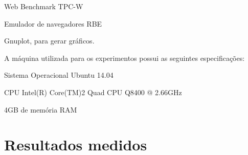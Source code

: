 \documentclass{article}
\begin{document}
Web Benchmark TPC-W
    
Emulador de navegadores RBE

Gnuplot, para gerar gráficos.


A máquina utilizada para os experimentos possui as seguintes especificações:

Sistema Operacional Ubuntu 14.04

CPU Intel(R) Core(TM)2 Quad CPU    Q8400  @ 2.66GHz

4GB de memória RAM





\section{Resultados medidos}
\end{document}
